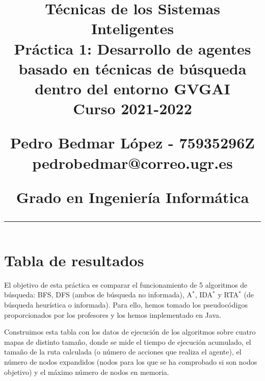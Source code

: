 \documentclass[12pt]{article} %
\title{	

\vspace{-2.5cm}
\LARGE \textbf{Técnicas de los Sistemas Inteligentes} \\
\LARGE Práctica 1: Desarrollo de agentes basado en técnicas de búsqueda dentro del entorno GVGAI \\[0.5em]
\large Curso 2021-2022 \par
\large Pedro Bedmar López - 75935296Z \\
\normalsize pedrobedmar@correo.ugr.es \par
\large Grado en Ingeniería Informática
\vspace{-7pt}
\rule{\textwidth}{0.4pt}
\vspace{-2cm}
}
\date{}
\begin{document}
\clearpage
\maketitle %

\section{Tabla de resultados}
El objetivo de esta práctica es comparar el funcionamiento de 5 algoritmos de búsqueda: BFS, DFS (ambos de búsqueda no informada), A$^*$, IDA$^*$ y RTA$^*$ (de búsqueda heurística o informada). Para ello, hemos tomado los pseudocódigos proporcionados por los profesores y los hemos implementado en Java.

Construimos esta tabla con los datos de ejecución de los algoritmos sobre cuatro mapas de distinto tamaño, donde se mide el tiempo de ejecución acumulado, el tamaño de la ruta calculada (o número de acciones que realiza el agente), el número de nodos expandidos (nodos para los que se ha comprobado si son nodos objetivo) y el máximo número de nodos en memoria.
\end{document}
